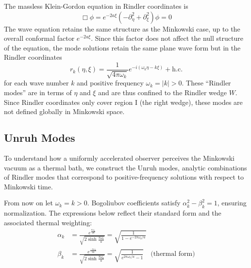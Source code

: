 \documentclass[12pt,a4paper]{article}
\begin{document}
The massless Klein-Gordon equation in Rindler coordinates is
\begin{equation}
  \Box \phi = e^{-2a \xi}(-\partial_\eta^2 + \partial_\xi^2) \phi = 0
\end{equation}
The wave equation retains the same structure as the Minkowski case, up to the overall conformal factor $e^{-2a\xi}$. Since this factor does not affect the null structure of the equation, the mode solutions retain the same plane wave form but in the Rindler coordinates
\begin{equation}
 r_k(\eta,\xi) = \frac{1}{\sqrt{4 \pi \omega_k}} e^{-i(\omega_k \eta -k \xi)} + \text{h.c.}
\end{equation}
for each wave number $k$ and positive frequency $\omega_k = |k| > 0$.  These ``Rindler modes'' are in terms of $\eta$ and $\xi$ and are thus confined to the Rindler wedge $W$.  Since Rindler coordinates only cover region I (the right wedge), these modes are not defined globally in Minkowski space.

\subsection{Unruh Modes}
To understand how a uniformly accelerated observer perceives the Minkowski vacuum as a thermal bath, we construct the Unruh modes, analytic combinations of Rindler modes that correspond to positive-frequency solutions with respect to Minkowski time.

From now on let $\omega_k = k > 0$. Bogoliubov coefficients satisfy $\alpha_k^2 - \beta_k^2 = 1$, ensuring normalization. The expressions below reflect their standard form and the associated thermal weighting:
\begin{equation}
  \begin{aligned}
    \alpha_k &= \frac{e^{\frac{\pi\omega_k}{2a}}}{\sqrt{2 \sinh \frac{\pi \omega_k}{a}}} = \sqrt{\frac{1}{1 - e^{-2\pi\omega_k / a}}}  \\
    \beta_k &= \frac{e^{\frac{-\pi\omega_k}{2a}}}{\sqrt{2 \sinh \frac{\pi \omega_k}{a}}} = \sqrt{\frac{1}{e^{2\pi\omega_k / a} - 1}} \quad \text{(thermal form)} \\
  \end{aligned}
  \label{alpha_beta}
\end{equation}
\end{document}
